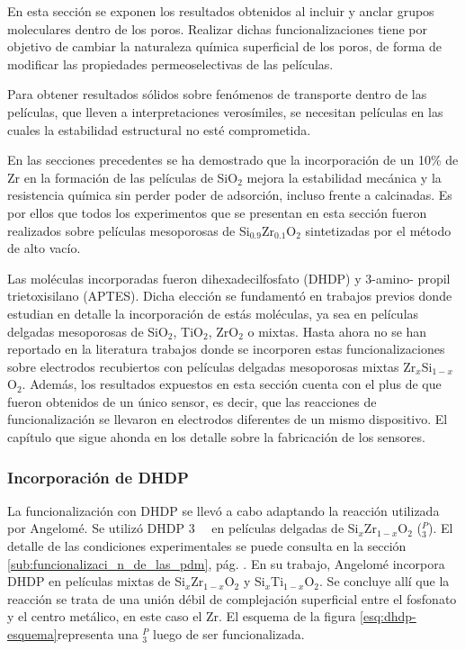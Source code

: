 			En esta sección se exponen los resultados obtenidos al incluir y anclar grupos moleculares dentro de los poros. Realizar dichas funcionalizaciones tiene por objetivo de cambiar la naturaleza química superficial de los poros, de forma de modificar las propiedades permeoselectivas de las películas. 

			Para obtener resultados sólidos sobre fenómenos de transporte dentro de las películas, que lleven a interpretaciones verosímiles, se necesitan películas en las cuales la estabilidad estructural no esté comprometida. 

			En las secciones precedentes se ha demostrado que la incorporación de un 10\% de Zr en la formación de las películas de SiO$_2$ mejora la estabilidad mecánica y la resistencia química sin perder poder de adsorción, incluso frente a \pdmF\space calcinadas. Es por ellos que todos los experimentos que se presentan en esta sección fueron realizados sobre películas mesoporosas de  Si$_{0.9}$Zr$_{0.1}$O$_2$ sintetizadas por el método de alto vacío.

			Las moléculas incorporadas fueron dihexadecilfosfato (DHDP) y 3-amino-\- propil trietoxisilano (APTES). Dicha elección se fundamentó en trabajos previos donde estudian en detalle la incorporación de estás moléculas, ya sea en películas delgadas mesoporosas de SiO$_2$, TiO$_2$, ZrO$_2$ o mixtas.\cite{Calvo2009b,Angelome2008,Fattakhova-Rohlfing2007,Andrieu-brunsen2014,Andrieu-Brunsen2015} Hasta ahora no se han reportado en la literatura trabajos donde se incorporen estas funcionalizaciones sobre electrodos recubiertos con películas delgadas mesoporosas mixtas Zr$_x$Si$_{1-x}$O$_2$. Además, los resultados expuestos en esta sección cuenta con el plus de que fueron obtenidos de un único sensor, es decir, que las reacciones de funcionalización se llevaron en electrodos diferentes de un mismo dispositivo. El capítulo que sigue ahonda en los detalle sobre la fabricación de los sensores.
	
		\subsubsection{Incorporación de DHDP}
	
			La funcionalización con DHDP se llevó a cabo adaptando la reacción utilizada por Angelomé\cite{Angelome2008}. Se utilizó DHDP \SI{3}{\milli\Molar} en películas delgadas de Si$_x$Zr$_{1-x}$O$_2$ (\pdmZ$^P_3$). El detalle de las condiciones experimentales se puede consulta en la sección \ref{sub:funcionalizaci_n_de_las_pdm}, pág. \pageref{sub:funcionalizaci_n_de_las_pdm}. En su trabajo, Angelomé incorpora DHDP en películas mixtas de Si$_x$Zr$_{1-x}$O$_2$ y Si$_x$Ti$_{1-x}$O$_2$. Se concluye allí que la reacción se trata de una unión débil de complejación superficial entre el fosfonato y el centro metálico, en este caso el Zr. El esquema de la figura \ref{esq:dhdp-esquema}representa una \pdmZ$^P_3$ luego de ser funcionalizada.


